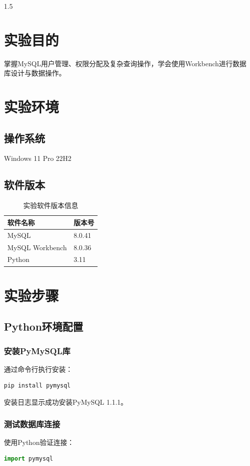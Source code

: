 \documentclass[a4paper,12pt]{report}
\begin{document}
\begin{spacing}{1.5}
\songti{}

\chapter{实验目的}
掌握MySQL用户管理、权限分配及复杂查询操作，学会使用Workbench进行数据库设计与数据操作。

\chapter{实验环境}
\section{操作系统}
Windows 11 Pro 22H2

\section{软件版本}
\begin{table}[H]
    \centering
    \begin{tabular}{|l|l|}
        \hline
        软件名称 & 版本号 \\
        \hline
        MySQL & 8.0.41 \\
        MySQL Workbench & 8.0.36 \\
        Python & 3.11 \\
        \hline
    \end{tabular}
    \caption{实验软件版本信息}
\end{table}

\chapter{实验步骤}
\section{Python环境配置}
\subsection{安装PyMySQL库}
通过命令行执行安装：
\begin{lstlisting}[language=bash]
pip install pymysql
\end{lstlisting}
安装日志显示成功安装PyMySQL 1.1.1。

\subsection{测试数据库连接}
使用Python验证连接：
\begin{lstlisting}[language=python]
import pymysql


\end{lstlisting}
\end{spacing}
\end{document}
